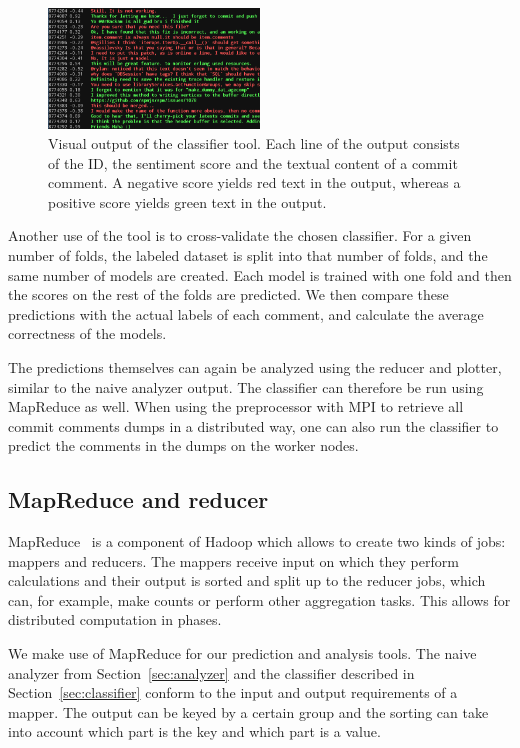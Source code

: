 \documentclass{article}
\begin{document}
\begin{figure}[h!]
  \centering
  \includegraphics[width=0.5\textwidth]{Images/Classifier.png}
  \caption{Visual output of the classifier tool. Each line of the output
           consists of the ID, the sentiment score and the textual content of
           a commit comment. A negative score yields red text in the output,
           whereas a positive score yields green text in the
           output.}\label{fig:classifier-output}
\end{figure}

Another use of the tool is to cross-validate the chosen classifier. For a given 
number of folds, the labeled dataset is split into that number of folds, and 
the same number of models are created. Each model is trained with one fold and 
then the scores on the rest of the folds are predicted. We then compare these 
predictions with the actual labels of each comment, and calculate the average 
correctness of the models.

The predictions themselves can again be analyzed using the reducer and plotter, 
similar to the naive analyzer output. The classifier can therefore be run using 
MapReduce as well. When using the preprocessor with MPI to retrieve all commit 
comments dumps in a distributed way, one can also run the classifier to predict
the comments in the dumps on the worker nodes.

\subsection{MapReduce and reducer}\label{sec:reducer}
MapReduce~\cite{dean2004mapreduce} is a component of Hadoop which allows to
create two kinds of jobs: mappers and reducers. The mappers receive input on
which they perform calculations and their output is sorted and split up to the
reducer jobs, which can, for example, make counts or perform other aggregation
tasks. This allows for distributed computation in phases.

We make use of MapReduce for our prediction and analysis tools. The naive 
analyzer from Section~\ref{sec:analyzer} and the classifier described in 
Section~\ref{sec:classifier} conform to the input and output requirements of 
a mapper. The output can be keyed by a certain group and the sorting can take 
into account which part is the key and which part is a value.
\end{document}
